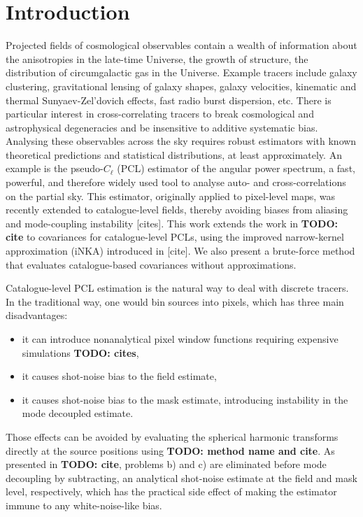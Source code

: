 \documentclass[aps,twocolumn, superscriptaddress, english, nofootinbib, 10pt]{revtex4-2}
\newcommand{\todo}[1]{{\color{blue}\bf TODO: #1}}
\begin{document}
\section{Introduction}\label{sec:intro}
    Projected fields of cosmological observables contain a wealth of information about the anisotropies in the late-time Universe, the growth of structure, the distribution of circumgalactic gas in the Universe. Example tracers include galaxy clustering, gravitational lensing of galaxy shapes, galaxy velocities, kinematic and thermal Sunyaev-Zel'dovich effects, fast radio burst dispersion, etc. There is particular interest in cross-correlating tracers to break cosmological and astrophysical degeneracies and be insensitive to additive systematic bias. Analysing these observables across the sky requires robust estimators with known theoretical predictions and statistical distributions, at least approximately. An example is the pseudo-$C_\ell$ (PCL) estimator of the angular power spectrum, a fast, powerful, and therefore widely used tool to analyse auto- and cross-correlations on the partial sky. This estimator, originally applied to pixel-level maps, was recently extended to catalogue-level fields, thereby avoiding biases from aliasing and mode-coupling instability [cites]. This work extends the work in \todo{cite} to covariances for catalogue-level PCLs, using the improved narrow-kernel approximation (iNKA) introduced in [cite]. We also present a brute-force method that evaluates catalogue-based covariances without approximations.

    Catalogue-level PCL estimation is the natural way to deal with discrete tracers. In the traditional way, one would bin sources into pixels, which has three main disadvantages:
    \begin{itemize}
        \item[a)] it can introduce nonanalytical pixel window functions requiring expensive simulations \todo{cites},
        \item[b)] it causes shot-noise bias to the field estimate,
        \item[c)] it causes shot-noise bias to the mask estimate, introducing instability in the mode decoupled estimate.
    \end{itemize}
    Those effects can be avoided by evaluating the spherical harmonic transforms directly at the source positions using \todo{method name and cite}. As presented in \todo{cite}, problems b) and c) are eliminated before mode decoupling by subtracting, an analytical shot-noise estimate at the field and mask level, respectively, which has the practical side effect of making the estimator immune to any white-noise-like bias.
    
\end{document}
